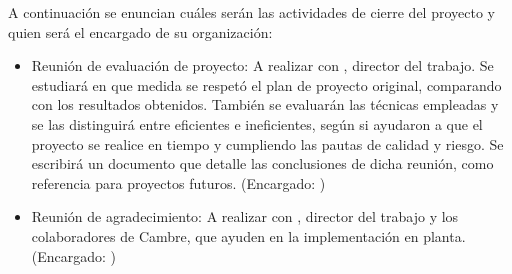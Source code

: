 \documentclass[
11pt, %
]{charter}
\begin{document}
A continuación se enuncian cuáles serán las actividades de cierre del proyecto y quien será el encargado de su organización:

\begin{itemize}
	\item Reunión de evaluación de proyecto: A realizar con \supname , director del trabajo. Se estudiará en que medida se respetó el plan de proyecto original, comparando con los resultados obtenidos. También se evaluarán las técnicas empleadas y se las distinguirá entre eficientes e ineficientes, según si ayudaron a que el proyecto se realice en tiempo y cumpliendo las pautas de calidad y riesgo. Se escribirá un documento que detalle las conclusiones de dicha reunión, como referencia para proyectos futuros. (Encargado: \authorname) 
	\item Reunión de agradecimiento: A realizar con \supname , director del trabajo y los colaboradores de Cambre, que ayuden en la implementación en planta. (Encargado: \authorname)
\end{itemize}
\end{document}
